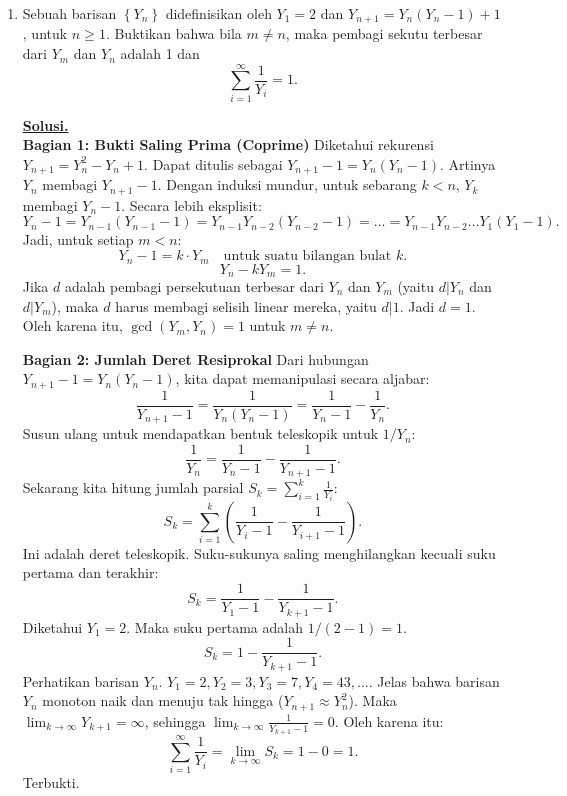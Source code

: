 \documentclass[12pt,twoside]{article}
\newenvironment{solution}
{
	\par\noindent\textbf{\underline{Solusi.}}\\
}
{
	\par
}
\begin{document}
\begin{enumerate}
  \item Sebuah barisan $\left\lbrace Y_n \right\rbrace$ didefinisikan oleh $Y_1 = 2$ dan $Y_{n+1} = Y_n(Y_n-1)+1$, untuk $n \geq 1.$ Buktikan bahwa bila $m \not= n$, maka pembagi sekutu terbesar dari $Y_m$ dan $Y_n$ adalah 1 dan
        \begin{equation*}
          \displaystyle\sum_{i = 1}^{\infty} \dfrac{1}{Y_i} = 1.
        \end{equation*}
        \begin{solution}
          \textbf{Bagian 1: Bukti Saling Prima (Coprime)}
          Diketahui rekurensi $Y_{n+1} = Y_n^2 - Y_n + 1$.
          Dapat ditulis sebagai $Y_{n+1} - 1 = Y_n(Y_n - 1)$.
          Artinya $Y_n$ membagi $Y_{n+1}-1$.
          Dengan induksi mundur, untuk sebarang $k < n$, $Y_k$ membagi $Y_n - 1$.
          Secara lebih eksplisit:
          \[ Y_n - 1 = Y_{n-1}(Y_{n-1}-1) = Y_{n-1} Y_{n-2} (Y_{n-2}-1) = \dots = Y_{n-1} Y_{n-2} \dots Y_1 (Y_1-1). \]
          Jadi, untuk setiap $m < n$:
          \[ Y_n - 1 = k \cdot Y_m \quad \text{untuk suatu bilangan bulat } k. \]
          \[ Y_n - k Y_m = 1. \]
          Jika $d$ adalah pembagi persekutuan terbesar dari $Y_n$ dan $Y_m$ (yaitu $d | Y_n$ dan $d | Y_m$), maka $d$ harus membagi selisih linear mereka, yaitu $d | 1$.
          Jadi $d = 1$.
          Oleh karena itu, $\gcd(Y_m, Y_n) = 1$ untuk $m \neq n$.

          \textbf{Bagian 2: Jumlah Deret Resiprokal}
          Dari hubungan $Y_{n+1} - 1 = Y_n(Y_n - 1)$, kita dapat memanipulasi secara aljabar:
          \[ \frac{1}{Y_{n+1}-1} = \frac{1}{Y_n(Y_n-1)} = \frac{1}{Y_n-1} - \frac{1}{Y_n}. \]
          Susun ulang untuk mendapatkan bentuk teleskopik untuk $1/Y_n$:
          \[ \frac{1}{Y_n} = \frac{1}{Y_n-1} - \frac{1}{Y_{n+1}-1}. \]
          Sekarang kita hitung jumlah parsial $S_k = \sum_{i=1}^k \frac{1}{Y_i}$:
          \[ S_k = \sum_{i=1}^k \left( \frac{1}{Y_i-1} - \frac{1}{Y_{i+1}-1} \right). \]
          Ini adalah deret teleskopik. Suku-sukunya saling menghilangkan kecuali suku pertama dan terakhir:
          \[ S_k = \frac{1}{Y_1 - 1} - \frac{1}{Y_{k+1} - 1}. \]
          Diketahui $Y_1 = 2$. Maka suku pertama adalah $1/(2-1) = 1$.
          \[ S_k = 1 - \frac{1}{Y_{k+1} - 1}. \]
          Perhatikan barisan $Y_n$. $Y_1=2, Y_2=3, Y_3=7, Y_4=43, \dots$.
          Jelas bahwa barisan $Y_n$ monoton naik dan menuju tak hingga ($Y_{n+1} \approx Y_n^2$).
          Maka $\lim_{k \to \infty} Y_{k+1} = \infty$, sehingga $\lim_{k \to \infty} \frac{1}{Y_{k+1}-1} = 0$.
          Oleh karena itu:
          \[ \sum_{i=1}^\infty \frac{1}{Y_i} = \lim_{k \to \infty} S_k = 1 - 0 = 1. \]
          Terbukti.
        \end{solution}



\end{enumerate}
\end{document}
